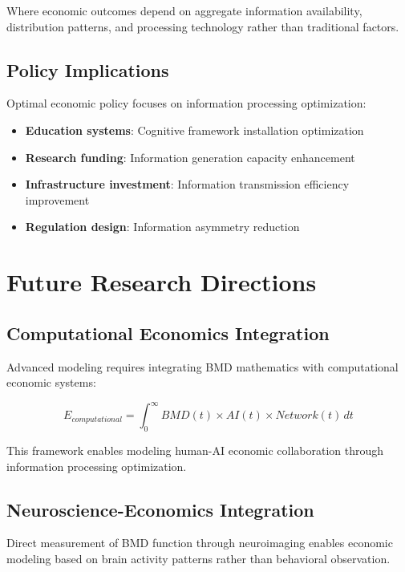 \documentclass[12pt,a4paper]{article}
\begin{document}
Where economic outcomes depend on aggregate information availability, distribution patterns, and processing technology rather than traditional factors.

\subsection{Policy Implications}

Optimal economic policy focuses on information processing optimization:

\begin{itemize}
\item \textbf{Education systems}: Cognitive framework installation optimization
\item \textbf{Research funding}: Information generation capacity enhancement
\item \textbf{Infrastructure investment}: Information transmission efficiency improvement
\item \textbf{Regulation design}: Information asymmetry reduction
\end{itemize}

\section{Future Research Directions}

\subsection{Computational Economics Integration}

Advanced modeling requires integrating BMD mathematics with computational economic systems:

\begin{equation}
E_{computational} = \int_{0}^{\infty} BMD(t) \times AI(t) \times Network(t) \, dt
\end{equation}

This framework enables modeling human-AI economic collaboration through information processing optimization.

\subsection{Neuroscience-Economics Integration}

Direct measurement of BMD function through neuroimaging enables economic modeling based on brain activity patterns rather than behavioral observation.
\end{document}
